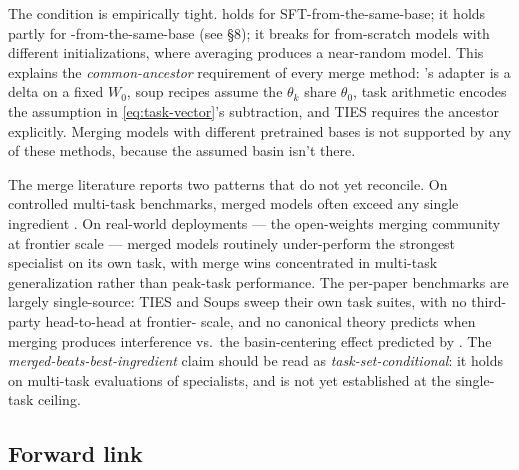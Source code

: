 The condition is empirically tight.  holds for
SFT-from-the-same-base; it holds partly for -from-the-same-base
(see \S8); it breaks for from-scratch models with different
initializations, where averaging produces a near-random model. This
explains the \emph{common-ancestor} requirement of every merge method:
's adapter is a delta on a fixed $W_0$, soup recipes assume the
$\theta_k$ share $\theta_0$, task arithmetic encodes the assumption in
\cref{eq:task-vector}'s subtraction, and TIES requires the ancestor
explicitly. Merging models with different pretrained bases is not
supported by any of these methods, because the assumed basin
isn't there.

\begin{contradiction}
The merge literature reports two patterns that do not yet reconcile.
On controlled multi-task benchmarks, merged models often exceed any
single ingredient \citep[\S 4]{yadav2023-ties-merging,
wortsman2022-model-soups}. On real-world deployments — the open-weights
 merging community at frontier scale — merged models routinely
under-perform the strongest specialist on its own task, with merge wins
concentrated in multi-task generalization rather than peak-task
performance. The per-paper benchmarks are largely single-source: TIES
\citep[\S 4]{yadav2023-ties-merging} and Soups
\citep[\S 4]{wortsman2022-model-soups} sweep their own task suites, with
no third-party head-to-head at frontier- scale, and no canonical
theory predicts when merging produces interference vs.\ the
basin-centering effect predicted by . The
\emph{merged-beats-best-ingredient} claim should be read as
\emph{task-set-conditional}: it holds on multi-task evaluations of
specialists, and is not yet established at the single-task ceiling.
\end{contradiction}

\subsection{Forward link}


